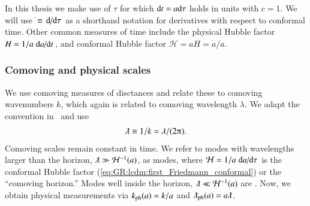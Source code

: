     In this thesis we make use of  $\tau$ for which ${\diff t} = a {\diff \tau}$ holds %
    in units with $c=1$. We will use $\dot{}\equiv\dv*{}{\tau}$ as a shorthand notation for derivatives with respect to conformal time. %
    Other common measures of time include the physical Hubble factor $H=1/a \dv*{a}{t}$, and conformal Hubble factor $\mathcal{H}= aH = \dot{a}/a$.



    \subsubsection{Comoving and physical scales}
    We use comoving measures of disctances and relate these to comoving wavenumbers $k$, which again is related to comoving wavelength $\lambda$. We adapt the convention in~\citet{maggioreGravitationalWavesVol2018} and use 
    \begin{align}
        \lambdabar \equiv   1/k  = \lambda/(2\ppi).
    \end{align}
    Comoving scales remain constant in time. We refer to modes with wavelengths larger than the horizon, $\lambdabar\gg \mathcal{H}^{-1}(a)$, as  modes, where $\mathcal{H}=1/a \dv*{a}{\tau}$ is the conformal Hubble factor (\cref{eq:GR:lcdm:first_Friedmann_conformal}) or the ``comoving horizon.'' %
    Modes well inside the horizon, $\lambdabar\ll \mathcal{H}^{-1}(a)$ are . %
    Now, we obtain physical measurements via $k_\mathrm{ph}(a) = k /a$ and $\lambdabar\ped{ph}(a) = a \lambdabar$.

